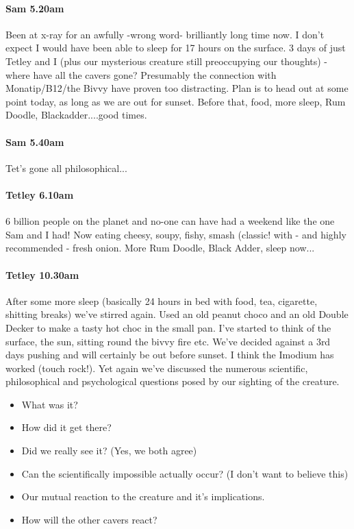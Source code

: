 \paragraph{Sam 5.20am}
Been at x-ray for an awfully -wrong word- brilliantly long time now. I don't expect I would have been able to sleep for 17 hours on the surface. 3 days of just Tetley and I (plus our mysterious creature still preoccupying our thoughts) - where have all the cavers gone? Presumably the connection with Monatip/B12/the Bivvy have proven too distracting. Plan is to head out at some point today, as long as we are out for sunset. Before that, food, more sleep, Rum Doodle, Blackadder....good times.


\paragraph{Sam 5.40am}
Tet’s gone all philosophical...


\paragraph{Tetley 6.10am}
6 billion people on the planet and no-one can have had a weekend like the one Sam and I had! Now eating cheesy, soupy, fishy, smash (classic! with - and highly recommended - fresh onion. More Rum Doodle, Black Adder, sleep now...


\paragraph{Tetley 10.30am}
After some more sleep (basically 24 hours in bed with food, tea, cigarette, shitting breaks) we’ve stirred again. Used an old peanut choco and an old Double Decker to make a tasty hot choc in the small pan. I’ve started to think of the surface, the sun, sitting round the bivvy fire etc. We’ve decided against a 3rd days pushing and will certainly be out before sunset. I think the Imodium has worked (touch rock!).
Yet again we’ve discussed the numerous scientific, philosophical and psychological questions posed by our sighting of the creature. 
\begin{itemize}
\item What was it?
\item How did it get there?
\item Did we really see it? (Yes, we both agree)
\item Can the scientifically impossible actually occur? (I don’t want to believe this)
\item Our mutual reaction to the creature and it’s implications.
\item How will the other cavers react?
\end{itemize}


